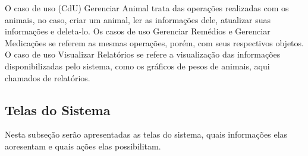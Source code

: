 O caso de uso (CdU) Gerenciar Animal trata das operações realizadas com os animais, no caso, criar um animal, ler as informações dele, atualizar suas informações e deleta-lo. Os casos de uso Gerenciar Remédios e Gerenciar Medicações se referem as mesmas operações, porém, com seus respectivos objetos. O caso de uso Visualizar Relatórios se refere a visualização das informações disponibilizadas pelo sistema, como os gráficos de pesos de animais, aqui chamados de relatórios.


\subsection{\textbf{Telas do Sistema}}\label{telas}
Nesta subseção serão apresentadas as telas do sistema, quais informações elas aoresentam e quais ações elas possibilitam.

